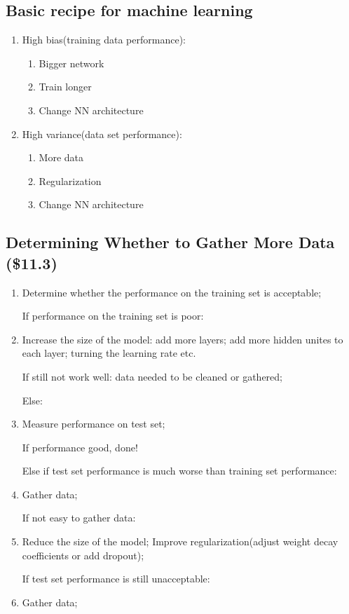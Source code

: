 \documentclass[12pt]{article}
\numberwithin{equation}{section}
\begin{document}
\subsection{Basic recipe for machine learning}
\begin{enumerate}
	\item High bias(training data performance):\par
	\begin{enumerate}
		\item Bigger network
		\item Train longer
		\item Change NN architecture 
	\end{enumerate}
	\item High variance(data set performance):\par
	\begin{enumerate}
		\item More data
		\item Regularization
		\item Change NN architecture 
	\end{enumerate}	
\end{enumerate}
\subsection{Determining Whether to Gather More Data (\$11.3)}
\begin{enumerate}
	\item Determine whether the performance on the training set is acceptable; \par
	If performance on the training set is poor:
	\item Increase the size of the model: add more layers; add more hidden unites to each layer; turning 
	the learning rate etc. \par
	If still not work well: data needed to be cleaned or gathered; \par
	Else:
	\item Measure performance on test set; \par
	If performance good, done!\par
	Else if test set performance is much worse than training set performance:
	\item Gather data;\par
	If not easy to gather data:
	\item Reduce the size of the model; Improve regularization(adjust weight decay coefficients or add dropout); \par
	If test set performance is still unacceptable:
	\item Gather data;
\end{enumerate}
\end{document}

